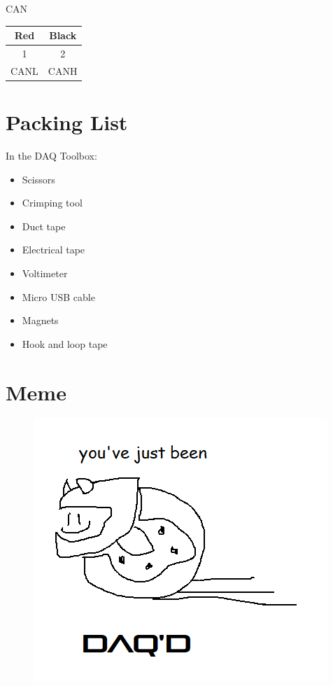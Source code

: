 \documentclass[12pt]{article}
\begin{document}
\noindent CAN

\begin{tabular}{|c|c|}
    \hline
    Red & Black \\
    \hline
    1 & 2 \\
    \hline
    CANL & CANH \\
    \hline
\end{tabular}
\pagebreak

\section{Packing List}
In the DAQ Toolbox:
\begin{itemize}
    \item Scissors
    \item Crimping tool
    \item Duct tape
    \item Electrical tape
    \item Voltimeter
    \item Micro USB cable
    \item Magnets
    \item Hook and loop tape
\end{itemize}
\section{Meme}
\begin{figure}[H]
    \centering
    \includegraphics{daqd.png}
\end{figure}
\end{document}
